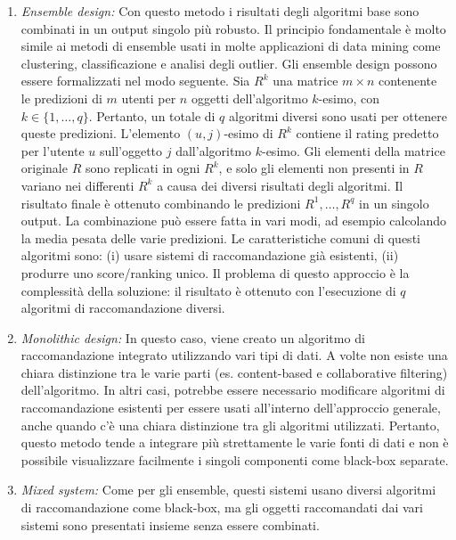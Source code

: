 \begin{enumerate}
 \item \textit{Ensemble design:} Con questo metodo i risultati degli algoritmi base sono combinati in un output singolo più robusto. Il principio fondamentale è molto simile ai metodi di ensemble usati in molte applicazioni di data mining come clustering, classificazione e analisi degli outlier. 
Gli ensemble design possono essere formalizzati nel modo seguente. Sia $R^k$ una matrice $m \times n$ contenente le predizioni di $m$ utenti per $n$ oggetti dell'algoritmo $k$-esimo, con $k \in \{1, \dots ,q\}$. Pertanto, un totale di $q$ algoritmi diversi sono usati per ottenere queste predizioni. L'elemento $(u,j)$-esimo di $R^k$ contiene il rating predetto per l'utente $u$ sull'oggetto $j$ dall'algoritmo $k$-esimo. Gli elementi della matrice originale $R$ sono replicati in ogni $R^k$, e solo gli elementi non presenti in $R$ variano nei differenti $R^k$ a causa dei diversi risultati degli algoritmi. Il risultato finale è ottenuto combinando le predizioni $R^1, \dots, R^q$ in un singolo output. La combinazione può essere fatta in vari modi, ad esempio calcolando la media pesata delle varie predizioni. Le caratteristiche comuni di questi algoritmi sono: (i) usare sistemi di raccomandazione già esistenti, (ii) produrre uno score/ranking unico. Il problema di questo approccio è la complessità della soluzione: il risultato è ottenuto con l'esecuzione di $q$ algoritmi di raccomandazione diversi.

 \item \textit{Monolithic design:} In questo caso, viene creato un algoritmo di raccomandazione integrato utilizzando vari tipi di dati. A volte non esiste una chiara distinzione tra le varie parti (es. content-based e collaborative filtering) dell'algoritmo. In altri casi, potrebbe essere necessario modificare algoritmi di raccomandazione esistenti per essere usati all'interno dell'approccio generale, anche quando c'è una chiara distinzione tra gli algoritmi utilizzati.  Pertanto, questo metodo tende a integrare più strettamente le varie fonti di dati e non è possibile visualizzare facilmente i singoli componenti come black-box separate.
 
 \item \textit{Mixed system:}  Come per gli ensemble, questi sistemi usano diversi algoritmi di raccomandazione come black-box, ma gli oggetti raccomandati dai vari sistemi sono presentati insieme senza essere combinati.
\end{enumerate} 

